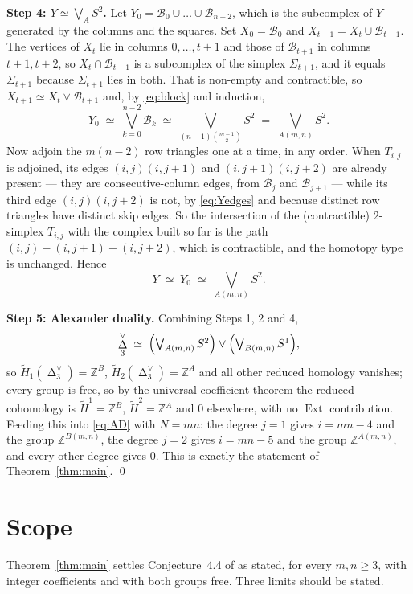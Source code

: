 \documentclass[11pt]{amsart}
\DeclareMathOperator{\Cut}{\Delta}
\newcommand{\Dual}[1]{#1^{\vee}}
\newcommand{\Hred}{\widetilde H}
\begin{document}
\medskip
\noindent\textbf{Step 4: $Y \simeq \bigvee_{A} S^2$.}
Let $Y_0 = \mathcal B_0 \cup \dots \cup \mathcal B_{n-2}$, which is the subcomplex of $Y$
generated by the columns and the squares. Set $X_0 = \mathcal B_0$ and
$X_{t+1} = X_t \cup \mathcal B_{t+1}$. The vertices of $X_t$ lie in columns $0,\dots,t+1$ and
those of $\mathcal B_{t+1}$ in columns $t+1,t+2$, so $X_t \cap \mathcal B_{t+1}$ is a subcomplex of
the simplex $\Sigma_{t+1}$, and it equals $\Sigma_{t+1}$ because $\Sigma_{t+1}$ lies in both.
That is non-empty and contractible, so $X_{t+1} \simeq X_t \vee \mathcal B_{t+1}$ and, by
\eqref{eq:block} and induction,
\[
  Y_0 \;\simeq\; \bigvee_{k=0}^{n-2}\mathcal B_k
  \;\simeq\; \textstyle\bigvee_{(n-1)\binom{m-1}{2}} S^2
  \;=\; \textstyle\bigvee_{A(m,n)} S^2 .
\]
Now adjoin the $m(n-2)$ row triangles one at a time, in any order. When $T_{i,j}$ is adjoined, its
edges $(i,j)(i,j{+}1)$ and $(i,j{+}1)(i,j{+}2)$ are already present --- they are
consecutive-column edges, from $\mathcal B_j$ and $\mathcal B_{j+1}$ --- while its third edge
$(i,j)(i,j{+}2)$ is not, by \eqref{eq:Yedges} and because distinct row triangles have distinct
skip edges. So the intersection of the (contractible) $2$-simplex $T_{i,j}$ with the complex built
so far is the path $(i,j)-(i,j{+}1)-(i,j{+}2)$, which is contractible, and the homotopy type is
unchanged. Hence
\[
  Y \;\simeq\; Y_0 \;\simeq\; \textstyle\bigvee_{A(m,n)} S^2 .
\]

\medskip
\noindent\textbf{Step 5: Alexander duality.}
Combining Steps 1, 2 and 4,
\[
  \Dual{\Cut_3} \;\simeq\;
  \Bigl(\textstyle\bigvee_{A(m,n)}S^2\Bigr) \vee \Bigl(\textstyle\bigvee_{B(m,n)}S^1\Bigr),
\]
so $\Hred_1(\Dual{\Cut_3}) = \mathbb Z^{B}$, $\Hred_2(\Dual{\Cut_3}) = \mathbb Z^{A}$ and all
other reduced homology vanishes; every group is free, so by the universal coefficient theorem the
reduced cohomology is $\Hred^{1} = \mathbb Z^{B}$, $\Hred^{2} = \mathbb Z^{A}$ and $0$ elsewhere,
with no $\operatorname{Ext}$ contribution. Feeding this into \eqref{eq:AD} with $N = mn$: the
degree $j=1$ gives $i = mn-4$ and the group $\mathbb Z^{B(m,n)}$, the degree $j=2$ gives
$i = mn-5$ and the group $\mathbb Z^{A(m,n)}$, and every other degree gives $0$. This is exactly
the statement of Theorem~\ref{thm:main}. \qed

\section{Scope}

Theorem~\ref{thm:main} settles Conjecture~4.4 of \cite{CSV} as stated, for every $m,n\ge3$, with
integer coefficients and with both groups free. Three limits should be stated.
\end{document}
